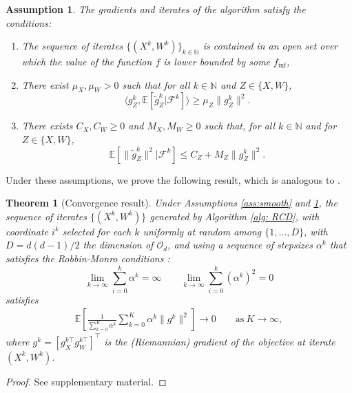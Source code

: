 \documentclass{article}
\def \N {\mathbb{N}}
\def \E {\mathbb{E}}
\def \O {\mathcal{O}}
\def \calF {\mathcal{F}}
\newtheorem{theorem}{Theorem}
\newtheorem{assumption}{Assumption}
\begin{document}
\begin{assumption} \label{ass:approxGradient}
The gradients and iterates of the algorithm satisfy the conditions:
\begin{enumerate}
    \item The sequence of iterates $\{ (X^k, W^k)\}_{k \in \mathbb{N}}$ is contained in an open set over which the value of the function $f$ is lower bounded by some $f_{\inf}$,
    \item There exist $\mu_X, \mu_W > 0$ such that for all $k \in \mathbb{N}$ and $Z \in \{X, W\}$,
    \[ \langle g_Z^k, \E \left[ \tilde{g}_Z^k | \calF^{k} \right] \rangle \geq \mu_Z \| g_Z^k \|^2.\]
    \item There exists $C_X, C_W \geq 0$ and $M_X, M_W \geq 0$ such that, for all $k \in \N$ and for $Z \in \{X, W\}$,
    \[\E \left[ \| \tilde{g}_Z^k\|^2 | \calF^{k}\right] \leq C_Z + M_Z \| g_Z^k\|^2.\]
\end{enumerate}
\end{assumption}


Under these assumptions, we prove the following result, which is analogous to \cite[Thm. 4.10]{Bottou2018}.
\begin{theorem}[Convergence result]
Under Assumptions \ref{ass:smooth} and \ref{ass:approxGradient}, the sequence of iterates $\{(X^k, W^k)\}$ generated by Algorithm \ref{alg: RCD}, with coordinate $i^k$ selected for each $k$ uniformly at random among $\{1, \dots, D\}$, with $D = d(d-1)/2$ the dimension of $\O_d$,  and using a sequence of stepsizes $\alpha^k$ that satisfies the Robbin-Monro conditions \cite{Robbins1951}:
\begin{equation} \label{eq: step}
    \lim_{k \to \infty} \sum_{i = 0}^k \alpha^k = \infty \qquad \lim_{k \to \infty} \sum_{i = 0}^k (\alpha^k)^2 = 0
\end{equation}
satisfies 
\begin{align}
    \mathbb{E} \left[ \frac{1}{\sum_{k = 0}^K \alpha^k} \sum_{k = 0}^K \alpha^k \| g^k \rVert^2 \right] \to 0 \qquad \text{as} \ K \to \infty,
\end{align}
where $g^k = [ g_X^{k \top} g_W^{k \top}]^\top$ is the (Riemannian) gradient of the objective at iterate $(X^k,W^k)$.
\end{theorem}
\begin{proof}
See supplementary material.
\end{proof}
\end{document}
